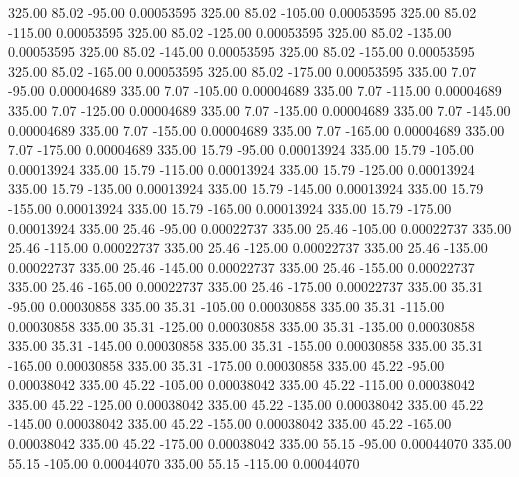     325.00     85.02    -95.00     0.00053595
    325.00     85.02   -105.00     0.00053595
    325.00     85.02   -115.00     0.00053595
    325.00     85.02   -125.00     0.00053595
    325.00     85.02   -135.00     0.00053595
    325.00     85.02   -145.00     0.00053595
    325.00     85.02   -155.00     0.00053595
    325.00     85.02   -165.00     0.00053595
    325.00     85.02   -175.00     0.00053595
    335.00      7.07    -95.00     0.00004689
    335.00      7.07   -105.00     0.00004689
    335.00      7.07   -115.00     0.00004689
    335.00      7.07   -125.00     0.00004689
    335.00      7.07   -135.00     0.00004689
    335.00      7.07   -145.00     0.00004689
    335.00      7.07   -155.00     0.00004689
    335.00      7.07   -165.00     0.00004689
    335.00      7.07   -175.00     0.00004689
    335.00     15.79    -95.00     0.00013924
    335.00     15.79   -105.00     0.00013924
    335.00     15.79   -115.00     0.00013924
    335.00     15.79   -125.00     0.00013924
    335.00     15.79   -135.00     0.00013924
    335.00     15.79   -145.00     0.00013924
    335.00     15.79   -155.00     0.00013924
    335.00     15.79   -165.00     0.00013924
    335.00     15.79   -175.00     0.00013924
    335.00     25.46    -95.00     0.00022737
    335.00     25.46   -105.00     0.00022737
    335.00     25.46   -115.00     0.00022737
    335.00     25.46   -125.00     0.00022737
    335.00     25.46   -135.00     0.00022737
    335.00     25.46   -145.00     0.00022737
    335.00     25.46   -155.00     0.00022737
    335.00     25.46   -165.00     0.00022737
    335.00     25.46   -175.00     0.00022737
    335.00     35.31    -95.00     0.00030858
    335.00     35.31   -105.00     0.00030858
    335.00     35.31   -115.00     0.00030858
    335.00     35.31   -125.00     0.00030858
    335.00     35.31   -135.00     0.00030858
    335.00     35.31   -145.00     0.00030858
    335.00     35.31   -155.00     0.00030858
    335.00     35.31   -165.00     0.00030858
    335.00     35.31   -175.00     0.00030858
    335.00     45.22    -95.00     0.00038042
    335.00     45.22   -105.00     0.00038042
    335.00     45.22   -115.00     0.00038042
    335.00     45.22   -125.00     0.00038042
    335.00     45.22   -135.00     0.00038042
    335.00     45.22   -145.00     0.00038042
    335.00     45.22   -155.00     0.00038042
    335.00     45.22   -165.00     0.00038042
    335.00     45.22   -175.00     0.00038042
    335.00     55.15    -95.00     0.00044070
    335.00     55.15   -105.00     0.00044070
    335.00     55.15   -115.00     0.00044070
